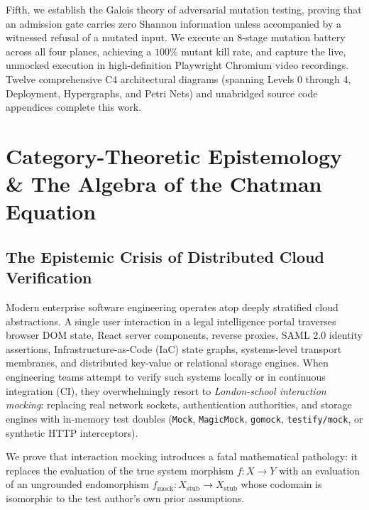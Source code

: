 \documentclass[10pt,twoside,openany]{book}
\theoremstyle{plain}
\theoremstyle{definition}
\theoremstyle{remark}
\begin{document}
Fifth, we establish the Galois theory of adversarial mutation testing, proving that an admission gate carries zero Shannon information unless accompanied by a witnessed refusal of a mutated input. We execute an 8-stage mutation battery across all four planes, achieving a $100\%$ mutant kill rate, and capture the live, unmocked execution in high-definition Playwright Chromium video recordings. Twelve comprehensive C4 architectural diagrams (spanning Levels 0 through 4, Deployment, Hypergraphs, and Petri Nets) and unabridged source code appendices complete this work.

\tableofcontents
\listoffigures
\listoftables

\mainmatter

\chapter{Category-Theoretic Epistemology \& The Algebra of the Chatman Equation}

\section{The Epistemic Crisis of Distributed Cloud Verification}
Modern enterprise software engineering operates atop deeply stratified cloud abstractions. A single user interaction in a legal intelligence portal traverses browser DOM state, React server components, reverse proxies, SAML 2.0 identity assertions, Infrastructure-as-Code (IaC) state graphs, systems-level transport membranes, and distributed key-value or relational storage engines. When engineering teams attempt to verify such systems locally or in continuous integration (CI), they overwhelmingly resort to \emph{London-school interaction mocking}: replacing real network sockets, authentication authorities, and storage engines with in-memory test doubles (\texttt{Mock}, \texttt{MagicMock}, \texttt{gomock}, \texttt{testify/mock}, or synthetic HTTP interceptors).

We prove that interaction mocking introduces a fatal mathematical pathology: it replaces the evaluation of the true system morphism $f: X \to Y$ with an evaluation of an ungrounded endomorphism $f_{\mathrm{mock}}: X_{\mathrm{stub}} \to X_{\mathrm{stub}}$ whose codomain is isomorphic to the test author's own prior assumptions.
\end{document}

